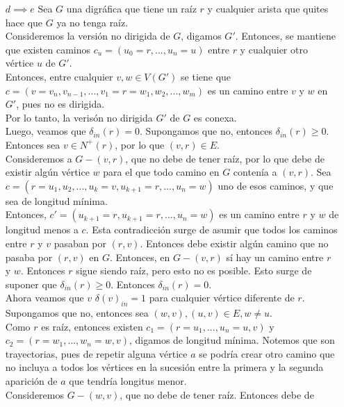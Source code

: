 \documentclass[12pt,a4paper]{report}
\begin{document}
\begin{enumerate}
{\begin{itemize}
				\item[$d \implies e$]{
					Sea $G$ una digráfica que tiene un raíz $r$ y cualquier arista que quites
					hace que $G$ ya no tenga raíz.\\
					Consideremos la versión no dirigida de $G$, digamos $G'$. Entonces, se
					mantiene que existen caminos $c_u = (u_0 = r, ..., u_n = u)$
					entre $r$ y cualquier otro vértice $u$ de $G'$.\\
					Entonces, entre cualquier $v, w \in V(G')$ se tiene que
					$c = (v = v_n, v_{n-1}, ..., v_1=r=w_1, w_2, ..., w_m)$ es un camino entre
					$v$ y $w$ en $G'$, pues no es dirigida.\\
					Por lo tanto, la verisón no dirigida $G'$ de $G$ es conexa.\\
					Luego, veamos que $\delta_{in}(r) = 0$.
					Supongamos que no, entonces $\delta_{in}(r) \geq 0$. Entonces sea
					$v \in N^+(r)$, por lo que $(v, r)\in E$.\\
					Consideremos a $G - {(v, r)}$, que no debe de tener raíz, por lo que debe
					de existir algún vértice $w$ para el que todo camino en $G$ contenía a $(v, r)$.
					Sea $c = (r = u_1, u_2, ..., u_k = v, u_{k+1} = r, ..., u_n = w)$ uno de
					esos caminos, y que sea de longitud mínima.\\
					Entonces, $c' = (u_{k+1} = r, u_{k+1} = r, ..., u_n = w)$ es un camino entre
					$r$ y $w$ de longitud menos a $c$. Esta contradicción surge de asumir que
					todos los caminos entre $r$ y $v$ pasaban por $(r, v)$. Entonces debe existir
					algún camino que no pasaba por $(r, v)$ en $G$. Entonces, en $G - {(v, r)}$
					sí hay un camino entre $r$ y $w$. Entonces $r$ sigue siendo raíz, pero esto
					no es posible. Esto surge de suponer que $\delta_{in}(r) \geq 0$.
					Entonces $\delta_{in}(r) = 0$.\\
					Ahora veamos que $v$ $\delta(v)_{in} = 1$ para cualquier vértice diferente
					de $r$.\\
					Supongamos que no, entonces sea $(w, v), (u, v) \in E, w \neq u$.\\
					Como $r$ es raíz, entonces existen $c_1 = (r = u_1, ..., u_n = u, v)$ y
					$c_2 = (r = w_1, ..., w_n=w, v)$, digamos de longitud mínima. Notemos que
					son trayectorias, pues de repetir alguna vértice $a$ se podría
					crear otro camino que no incluya a todos los vértices en la sucesión entre
					la primera y la segunda aparición de $a$ que tendría longitus menor.\\
					Consideremos $G - {(w, v)}$, que no debe de tener raíz. Entonces debe de
}
\end{itemize}}
\end{enumerate}
\end{document}
